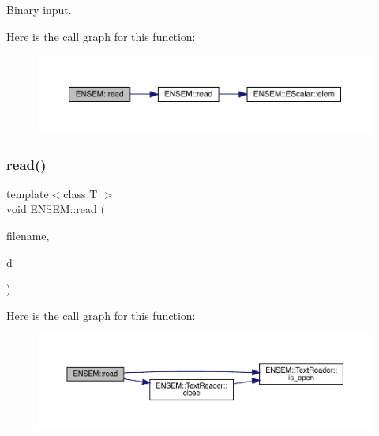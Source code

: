 Binary input. 

Here is the call graph for this function\+:\nopagebreak
\begin{figure}[H]
\begin{center}
\leavevmode
\includegraphics[width=350pt]{d2/d94/namespaceENSEM_aebc1e0b81049724d5c9a99befb160609_cgraph}
\end{center}
\end{figure}
\mbox{\label{namespaceENSEM_a22fcd7a4711d3682c9d89b9f605f11b4}} 
\subsubsection{\texorpdfstring{read()}{read()}\hspace{0.1cm}{\footnotesize\ttfamily [10/11]}}
{\footnotesize\ttfamily template$<$class T $>$ \\
void E\+N\+S\+E\+M\+::read (\begin{DoxyParamCaption}\item[{const std\+::string \&}]{filename,  }\item[{\mbox{\hyperlink{classENSEM_1_1EScalar}{E\+Scalar}}$<$ T $>$ \&}]{d }\end{DoxyParamCaption})\hspace{0.3cm}{\ttfamily [inline]}}

Here is the call graph for this function\+:\nopagebreak
\begin{figure}[H]
\begin{center}
\leavevmode
\includegraphics[width=350pt]{d2/d94/namespaceENSEM_a22fcd7a4711d3682c9d89b9f605f11b4_cgraph}
\end{center}
\end{figure}
\mbox{\label{namespaceENSEM_abba4aaa73ad3238ce36775177195cbdc}} 
